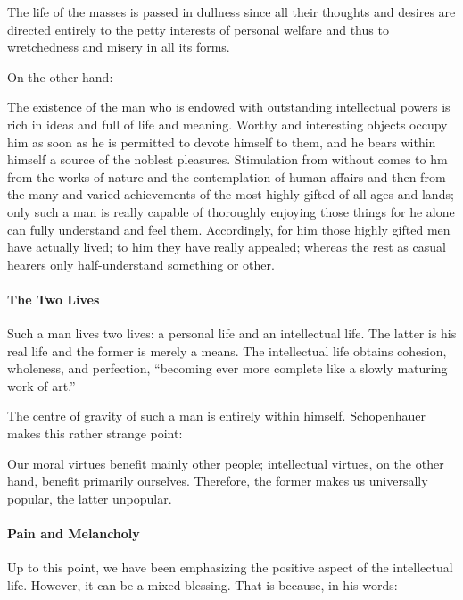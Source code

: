 \begin{quotex}
The life of the masses is passed in dullness since all their thoughts and desires are directed entirely to the petty
interests of personal welfare and thus to wretchedness and misery in all its forms. 

\end{quotex}
On the other hand:

\begin{quotex}
The existence of the man who is endowed with outstanding intellectual powers is rich in ideas and full of life and
meaning. Worthy and interesting objects occupy him as soon as he is permitted to devote himself to them, and he bears
within himself a source of the noblest pleasures. Stimulation from without comes to hm from the works of nature and the
contemplation of human affairs and then from the many and varied achievements of the most highly gifted of all ages and
lands; only such a man is really capable of thoroughly enjoying those things for he alone can fully understand and feel
them. Accordingly, for him those highly gifted men have actually lived; to him they have really appealed; whereas the
rest as casual hearers only half-understand something or other. 

\end{quotex}
\paragraph{The Two Lives}
Such a man lives two lives: a personal life and an intellectual life. The latter is his real life and the former is
merely a means. The intellectual life obtains cohesion, wholeness, and perfection, “becoming ever more complete like a
slowly maturing work of art.”

The centre of gravity of such a man is entirely within himself. Schopenhauer makes this rather strange point:

\begin{quotex}
Our moral virtues benefit mainly other people; intellectual virtues, on the other hand, benefit primarily ourselves.
Therefore, the former makes us universally popular, the latter unpopular. 

\end{quotex}
\paragraph{Pain and Melancholy}
Up to this point, we have been emphasizing the positive aspect of the intellectual life. However, it can be a mixed
blessing. That is because, in his words:

